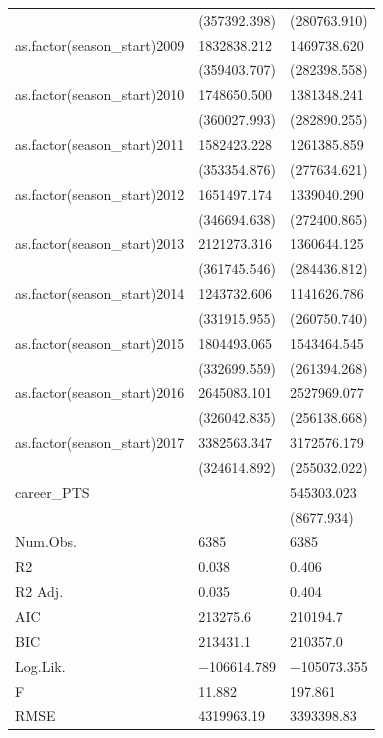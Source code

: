\documentclass[
]{book}
\begin{document}
\begin{table}
\begin{tabular}[t]{lll}
 & (\num{357392.398}) & (\num{280763.910})\\
as.factor(season\_start)2009 & \num{1832838.212} & \num{1469738.620}\\
 & (\num{359403.707}) & (\num{282398.558})\\
as.factor(season\_start)2010 & \num{1748650.500} & \num{1381348.241}\\
 & (\num{360027.993}) & (\num{282890.255})\\
as.factor(season\_start)2011 & \num{1582423.228} & \num{1261385.859}\\
 & (\num{353354.876}) & (\num{277634.621})\\
as.factor(season\_start)2012 & \num{1651497.174} & \num{1339040.290}\\
 & (\num{346694.638}) & (\num{272400.865})\\
as.factor(season\_start)2013 & \num{2121273.316} & \num{1360644.125}\\
 & (\num{361745.546}) & (\num{284436.812})\\
as.factor(season\_start)2014 & \num{1243732.606} & \num{1141626.786}\\
 & (\num{331915.955}) & (\num{260750.740})\\
as.factor(season\_start)2015 & \num{1804493.065} & \num{1543464.545}\\
 & (\num{332699.559}) & (\num{261394.268})\\
as.factor(season\_start)2016 & \num{2645083.101} & \num{2527969.077}\\
 & (\num{326042.835}) & (\num{256138.668})\\
as.factor(season\_start)2017 & \num{3382563.347} & \num{3172576.179}\\
 & (\num{324614.892}) & (\num{255032.022})\\
career\_PTS &  & \num{545303.023}\\
 &  & (\num{8677.934})\\
\midrule
Num.Obs. & \num{6385} & \num{6385}\\
R2 & \num{0.038} & \num{0.406}\\
R2 Adj. & \num{0.035} & \num{0.404}\\
AIC & \num{213275.6} & \num{210194.7}\\
BIC & \num{213431.1} & \num{210357.0}\\
Log.Lik. & \num{-106614.789} & \num{-105073.355}\\
F & \num{11.882} & \num{197.861}\\
RMSE & \num{4319963.19} & \num{3393398.83}\\
\bottomrule
\end{tabular}
\end{table}
\end{document}
